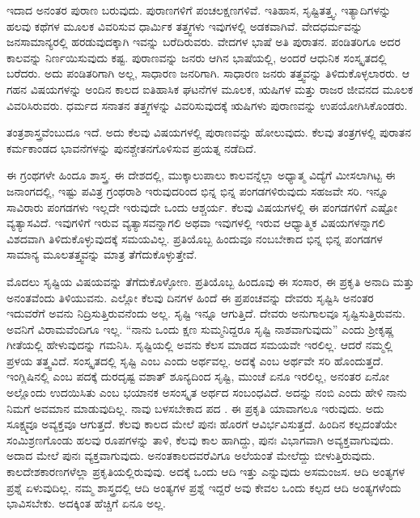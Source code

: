 ಇದಾದ ಅನಂತರ ಪುರಾಣ ಬರುವುದು. ಪುರಾಣಗಳಿಗೆ ಪಂಚಲಕ್ಷಣಗಳಿವೆ. ಇತಿಹಾಸ, ಸೃಷ್ಟಿತತ್ತ್ವ, ಇತ್ಯಾದಿಗಳನ್ನು ಹಲವು ಕಥೆಗಳ ಮೂಲಕ ವಿವರಿಸುವ ಧಾರ್ಮಿಕ ತತ್ತ್ವಗಳು ಇವುಗಳಲ್ಲಿ ಅಡಕವಾಗಿವೆ. ವೇದಧರ್ಮವನ್ನು ಜನಸಾಮಾನ್ಯರಲ್ಲಿ ಹರಡುವುದಕ್ಕಾಗಿ ಇವನ್ನು ಬರೆದಿರುವರು. ವೇದಗಳ ಭಾಷೆ ಅತಿ ಪುರಾತನ. ಪಂಡಿತರಿಗೂ ಅದರ ಕಾಲವನ್ನು ನಿರ್ಣಯಿಸುವುದು ಕಷ್ಟ. ಪುರಾಣವನ್ನು ಜನರು ಆಗಿನ ಭಾಷೆಯಲ್ಲಿ, ಅಂದರೆ ಆಧುನಿಕ ಸಂಸ್ಕೃತದಲ್ಲಿ ಬರೆದರು. ಅದು ಪಂಡಿತರಿಗಾಗಿ ಅಲ್ಲ, ಸಾಧಾರಣ ಜನರಿಗಾಗಿ. ಸಾಧಾರಣ ಜನರು ತತ್ತ್ವವನ್ನು ತಿಳಿದುಕೊಳ್ಳಲಾರರು. ಆ ಗಹನ ವಿಷಯಗಳನ್ನು ಅಂದಿನ ಕಾಲದ ಐತಿಹಾಸಿಕ ಘಟನೆಗಳ ಮೂಲಕ, ಋಷಿಗಳ ಮತ್ತು ರಾಜರ ಜೀವನದ ಮೂಲಕ ವಿವರಿಸಿರುವರು. ಧರ್ಮದ ಸನಾತನ ತತ್ತ್ವಗಳನ್ನು ವಿವರಿಸುವುದಕ್ಕೆ ಋಷಿಗಳು ಪುರಾಣವನ್ನು ಉಪಯೋಗಿಸಿಕೊಂಡರು.

ತಂತ್ರಶಾಸ್ತ್ರವೆಂಬುದೂ ಇದೆ. ಅದು ಕೆಲವು ವಿಷಯಗಳಲ್ಲಿ ಪುರಾಣವನ್ನು ಹೋಲುವುದು. ಕೆಲವು ತಂತ್ರಗಳಲ್ಲಿ ಪುರಾತನ ಕರ್ಮಕಾಂಡದ ಭಾವನೆಗಳನ್ನು ಪುನಶ್ಚೇತನಗೊಳಿಸುವ ಪ್ರಯತ್ನ ನಡೆದಿದೆ.

ಈ ಗ್ರಂಥಗಳೇ ಹಿಂದೂ ಶಾಸ್ತ್ರ. ಈ ದೇಶದಲ್ಲಿ, ಮುಕ್ಕಾಲುಪಾಲು ಕಾಲವನ್ನೆಲ್ಲಾ ಅಧ್ಯಾತ್ಮ ವಿದ್ಯೆಗೆ ಮೀಸಲಾಗಿಟ್ಟ ಈ ಜನಾಂಗದಲ್ಲಿ, ಇಷ್ಟು ಪವಿತ್ರ ಗ್ರಂಥರಾಶಿ ಇರುವುದರಿಂದ ಭಿನ್ನ ಭಿನ್ನ ಪಂಗಡಗಳಿರುವುದು ಸಹಜವೇ ಸರಿ. ಇನ್ನೂ ಸಾವಿರಾರು ಪಂಗಡಗಳು ಇಲ್ಲದೇ ಇರುವುದೇ ಒಂದು ಆಶ್ಚರ್ಯ. ಕೆಲವು ವಿಷಯಗಳಲ್ಲಿ ಈ ಪಂಗಡಗಳಿಗೆ ಎಷ್ಟೋ ವ್ಯತ್ಯಾಸವಿದೆ. ಇವುಗಳಿಗೆ ಇರುವ ವ್ಯತ್ಯಾಸವನ್ನಾಗಲಿ ಅಥವಾ ಇವುಗಳಲ್ಲಿ ಇರುವ ಆಧ್ಯಾತ್ಮಿಕ ವಿಷಯಗಳನ್ನಾಗಲಿ ವಿಶದವಾಗಿ ತಿಳಿದುಕೊಳ್ಳುವುದಕ್ಕೆ ಸಮಯವಿಲ್ಲ. ಪ್ರತಿಯೊಬ್ಬ ಹಿಂದುವೂ ನಂಬಬೇಕಾದ ಭಿನ್ನ ಭಿನ್ನ ಪಂಗಡಗಳ ಸಾಮಾನ್ಯ ಮೂಲತತ್ತ್ವವನ್ನು ಮಾತ್ರ ತೆಗೆದುಕೊಳ್ಳುತ್ತೇವೆ.

ಮೊದಲು ಸೃಷ್ಟಿಯ ವಿಷಯವನ್ನು ತೆಗೆದುಕೊಳ್ಳೋಣ. ಪ್ರತಿಯೊಬ್ಬ ಹಿಂದೂವು ಈ ಸಂಸಾರ, ಈ ಪ್ರಕೃತಿ ಅನಾದಿ ಮತ್ತು ಅನಂತವೆಂದು ತಿಳಿಯುವನು. ಎಲ್ಲೋ ಕೆಲವು ದಿನಗಳ ಹಿಂದೆ ಈ ಪ್ರಪಂಚವನ್ನು ದೇವರು ಸೃಷ್ಟಿಸಿ ಅನಂತರ ಇದುವರೆಗೆ ಅವನು ನಿದ್ರಿಸುತ್ತಿರುವನೆಂದು ಅಲ್ಲ. ಸೃಷ್ಟಿ ಇನ್ನೂ ಆಗುತ್ತಿದೆ. ದೇವರು ಅನುಗಾಲವೂ ಸೃಷ್ಟಿಸುತ್ತಿರುವನು. ಅವನಿಗೆ ವಿರಾಮವೆಂದಿಗೂ ಇಲ್ಲ. “ನಾನು ಒಂದು ಕ್ಷಣ ಸುಮ್ಮನಿದ್ದರೂ ಸೃಷ್ಟಿ ನಾಶವಾಗುವುದು” ಎಂದು ಶ‍್ರೀಕೃಷ್ಣ ಗೀತೆಯಲ್ಲಿ ಹೇಳುವುದನ್ನು ಗಮನಿಸಿ. ಸೃಷ್ಟಿಯಲ್ಲಿ ಅವನು ಕೆಲಸ ಮಾಡದ ಸಮಯವೇ ಇರಲಿಲ್ಲ. ಆದರೆ ನಮ್ಮಲ್ಲಿ ಪ್ರಳಯ ತತ್ತ್ವವಿದೆ. ಸಂಸ್ಕೃತದಲ್ಲಿ ಸೃಷ್ಟಿ ಎಂಬ  ಎಂದು ಅರ್ಥವಲ್ಲ. ಅದಕ್ಕೆ  ಎಂಬ ಅರ್ಥವೇ ಸರಿ ಹೊಂದುತ್ತದೆ. ಇಂಗ್ಲಿಷಿನಲ್ಲಿ  ಎಂಬ ಪದಕ್ಕೆ ದುರದೃಷ್ಟ ವಶಾತ್​ ಶೂನ್ಯದಿಂದ ಸೃಷ್ಟಿ, ಮುಂಚೆ ಏನೂ ಇರಲಿಲ್ಲ, ಅನಂತರ ಏನೋ ಅಲ್ಲೊಂದು ಉದಯಿಸಿತು ಎಂಬ ಭಯಾನಕ ಅಸಂಸ್ಕೃತ ಅರ್ಥದ ಸಂಬಂಧವಿದೆ. ಅದನ್ನು ನಂಬಿ ಎಂದು ಹೇಳಿ ನಾನು ನಿಮಗೆ ಅವಮಾನ ಮಾಡುವುದಿಲ್ಲ. ನಾವು ಬಳಸಬೇಕಾದ ಪದ . ಈ ಪ್ರಕೃತಿ ಯಾವಾಗಲೂ ಇರುವುದು. ಅದು ಸೂಕ್ಷ್ಮವೂ ಅವ್ಯಕ್ತವೂ ಆಗುತ್ತದೆ. ಕೆಲವು ಕಾಲದ ಮೇಲೆ ಪುನಃ ಹೊರಗೆ ಆವಿರ್ಭವಿಸುತ್ತದೆ. ಹಿಂದಿನ ಕಲ್ಪದಂತೆಯೇ ಸಂಮಿಶ್ರಣಗೊಂಡು ಹಲವು ರೂಪಗಳನ್ನು ತಾಳಿ, ಕೆಲವು ಕಾಲ ಹಾಗಿದ್ದು, ಪುನಃ ವಿಭಾಗವಾಗಿ ಅವ್ಯಕ್ತವಾಗುವುದು. ಅದಾದ ಮೇಲೆ ಪುನಃ ವ್ಯಕ್ತವಾಗುವುದು. ಅನಂತಕಾಲದವರೆವಿಗೂ ಅಲೆಯಂತೆ ಮೇಲೆದ್ದು ಬೀಳುತ್ತಿರುವುದು. ಕಾಲದೇಶಕಾರಣಗಳೆಲ್ಲಾ ಪ್ರಕೃತಿಯಲ್ಲಿರುವುವು. ಅದಕ್ಕೆ ಒಂದು ಆದಿ ಇತ್ತು ಎನ್ನುವುದು ಅಸಮಂಜಸ. ಆದಿ ಅಂತ್ಯಗಳ ಪ್ರಶ್ನೆ ಏಳುವುದಿಲ್ಲ. ನಮ್ಮ ಶಾಸ್ತ್ರದಲ್ಲಿ ಆದಿ ಅಂತ್ಯಗಳ ಪ್ರಶ್ನೆ ಇದ್ದರೆ ಅವು ಕೇವಲ ಒಂದು ಕಲ್ಪದ ಆದಿ ಅಂತ್ಯಗಳೆಂದು ಭಾವಿಸಬೇಕು. ಅದಕ್ಕಿಂತ ಹೆಚ್ಚಿಗೆ ಏನೂ ಅಲ್ಲ.

